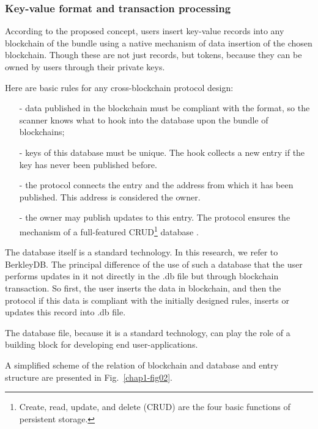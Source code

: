 \begin{multicols}{2}
\subsubsection{Key-value format and transaction processing}\label{subsubsec-4.1.2}

According to the proposed concept, users insert key-value records into any blockchain of the bundle using a native mechanism of data insertion of the chosen blockchain. Though these are not just records, but tokens, because they can be owned by users through their private keys.

Here are basic rules for any cross-blockchain protocol design:
\begin{itemize}
\item [-]data published in the blockchain must be compliant with the format, so the scanner knows what to hook into the database upon the bundle of blockchains;
\item [-] keys of this database must be unique. The hook collects a new entry if the key has never been published before.
\item [-] the protocol connects the entry and the address from which it has been published. This address is considered the owner.
\item [-] the owner may publish updates to this entry. The protocol ensures the mechanism of a full-featured CRUD\footnote{Create, read, update, and delete (CRUD) are the four basic functions of persistent storage.} database \cite{art1-key27}.
\end{itemize}

The database itself is a standard technology. In this research, we refer to BerkleyDB. The principal difference of the use of such a database that the user performs updates in it not directly in the .db file but through blockchain transaction. So first, the user inserts the data in blockchain, and then the protocol if this data is compliant with the initially designed rules, inserts or updates this record into .db file.

The database file, because it is a standard technology, can play the role of a building block for developing end user-applications.

A simplified scheme of the relation of blockchain and database and entry structure are presented in Fig.~\ref{chap1-fig02}.



\end{multicols}
